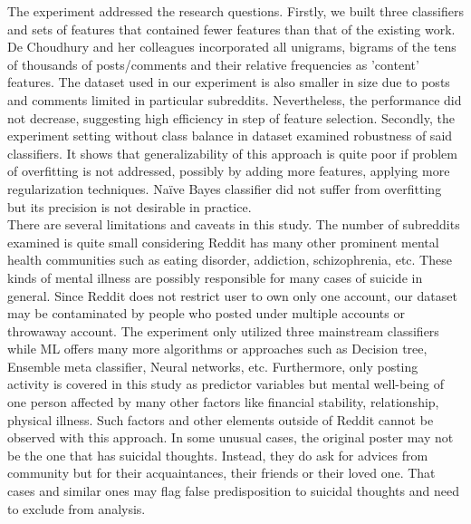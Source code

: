 The experiment addressed the research questions. Firstly, we built three classifiers and sets of features that contained fewer features than that of the existing work. De Choudhury and her colleagues \cite{DeChoudhury2016} incorporated all unigrams, bigrams of the tens of thousands of posts/comments and their relative frequencies as 'content' features. The dataset used in our experiment is also smaller in size due to posts and comments limited in particular subreddits. Nevertheless, the performance did not decrease, suggesting high efficiency in step of feature selection. Secondly, the experiment setting without class balance in dataset examined robustness of said classifiers. It shows that generalizability of this approach is quite poor if problem of overfitting is not addressed, possibly by adding more features, applying more regularization techniques. Na\"ive Bayes classifier did not suffer from overfitting but its precision is not desirable in practice.\\
There are several limitations and caveats in this study. The number of subreddits examined is quite small considering Reddit has many other prominent mental health communities such as eating disorder, addiction, schizophrenia, etc. These kinds of mental illness are possibly responsible for many cases of suicide in general. Since Reddit does not restrict user to own only one account, our dataset may be contaminated by people who posted under multiple accounts or throwaway account. The experiment only utilized three mainstream classifiers while ML offers many more algorithms or approaches such as Decision tree,  Ensemble meta classifier, Neural networks, etc. Furthermore, only posting activity is covered in this study as predictor variables but mental well-being of one person affected by many other factors like financial stability, relationship, physical illness. Such factors and other elements outside of Reddit cannot be observed with this approach. In some unusual cases, the original poster may not be the one that has suicidal thoughts. Instead, they do ask for advices from community but for their acquaintances, their friends or their loved one. That cases and similar ones may flag false predisposition to suicidal thoughts and need to exclude from analysis.\\

